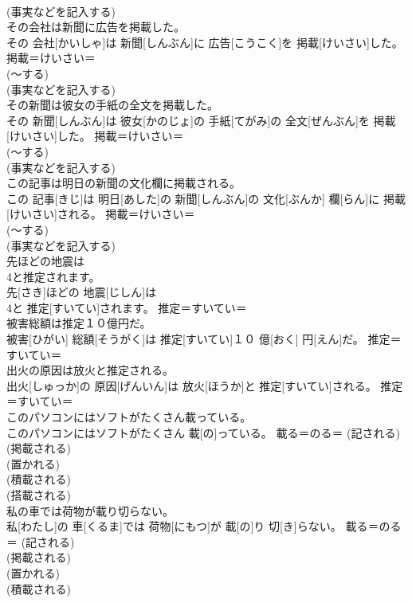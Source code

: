 \documentclass[8pt]{extreport}
\begin{document}
\begin{CJK}{UTF8}{min}
{\\	(事実などを記入する) 
\\	その会社は新聞に広告を掲載した。	
\\	その 会社[かいしゃ]は 新聞[しんぶん]に 広告[こうこく]を 掲載[けいさい]した。	掲載＝けいさい＝ 
\\	(〜する) 
\\	(事実などを記入する) 
\\	その新聞は彼女の手紙の全文を掲載した。	
\\	その 新聞[しんぶん]は 彼女[かのじょ]の 手紙[てがみ]の 全文[ぜんぶん]を 掲載[けいさい]した。	掲載＝けいさい＝ 
\\	(〜する) 
\\	(事実などを記入する) 
\\	この記事は明日の新聞の文化欄に掲載される。	
\\	この 記事[きじ]は 明日[あした]の 新聞[しんぶん]の 文化[ぶんか] 欄[らん]に 掲載[けいさい]される。	掲載＝けいさい＝ 
\\	(〜する) 
\\	(事実などを記入する) 
\\	先ほどの地震は
\\	4と推定されます。	
\\	先[さき]ほどの 地震[じしん]は 
\\	4と 推定[すいてい]されます。	推定＝すいてい＝ 
\\	被害総額は推定１０億円だ。	
\\	被害[ひがい] 総額[そうがく]は 推定[すいてい]１０ 億[おく] 円[えん]だ。	推定＝すいてい＝ 
\\	出火の原因は放火と推定される。	
\\	出火[しゅっか]の 原因[げんいん]は 放火[ほうか]と 推定[すいてい]される。	推定＝すいてい＝ 
\\	このパソコンにはソフトがたくさん載っている。	
\\	このパソコンにはソフトがたくさん 載[の]っている。	載る＝のる＝ (記される) 
\\	(掲載される) 
\\	(置かれる) 
\\	(積載される) 
\\	(搭載される) 
\\	私の車では荷物が載り切らない。	
\\	私[わたし]の 車[くるま]では 荷物[にもつ]が 載[の]り 切[き]らない。	載る＝のる＝ (記される) 
\\	(掲載される) 
\\	(置かれる) 
\\	(積載される) 
}
\end{CJK}
\end{document}
